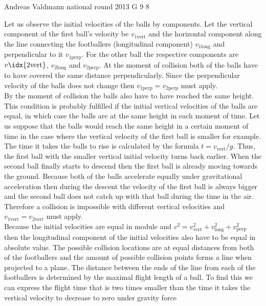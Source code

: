 \documentclass[11pt]{article}
\begin{document}
{Andreas Valdmann} %
{national round} %
{2013} %
{G 9} %
{8} %
{

\ifEngSolution
Let us observe the initial velocities of the balls by components. Let the vertical component of the first ball’s velocity be $v_{1\mathrm{vert}}$ and the horizontal component along the line connecting the footballers (longitudinal component) $v_{1\mathrm{long}}$ and perpendicular to it $v_{1\mathrm{perp}}$. For the other ball the respective components are $v\idx{2\mathrm{vert}}$, $v_{2\mathrm{long}}$ and $v_{2\mathrm{perp}}$. At the moment of collision both of the balls have to have covered the same distance perpendicularly. Since the perpendicular velocity of the balls does not change then $v_{1\mathrm{perp}}=v_{2\mathrm{perp}}$ must apply.\\
By the moment of collision the balls also have to have reached the same height. This condition is probably fulfilled if the initial vertical velocities of the balls are equal, in which case the balls are at the same height in each moment of time. Let us suppose that the balls would reach the same height in a certain moment of time in the case where the vertical velocity of the first ball is smaller for example. The time it takes the balls to rise is calculated by the formula $t=v_{\mathrm{vert}}/g$. Thus, the first ball with the smaller vertical initial velocity turns back earlier. When the second ball finally starts to descend then the first ball is already moving towards the ground. Because both of the balls accelerate equally under gravitational acceleration then during the descent the velocity of the first ball is always bigger and the second ball does not catch up with that ball during the time in the air. Therefore a collision is impossible with different vertical velocities and $v_{1\mathrm{vert}}=v_{2\mathrm{vert}}$ must apply.\\
Because the initial velocities are equal in module and $v^2=v_{\mathrm{vert}}^2+v_{\mathrm{long}}^2+v_{\mathrm{perp}}^2$ then the longitudinal component of the initial velocities also have to be equal in absolute value. The possible collision locations are at equal distances from both of the footballers and the amount of possible collision points forms a line when projected to a plane. The distance between the ends of the line from each of the footballers is determined by the maximal flight length of a ball. To find this we can express the flight time that is two times smaller than the time it takes the vertical velocity to decrease to zero under gravity force
}
\end{document}
